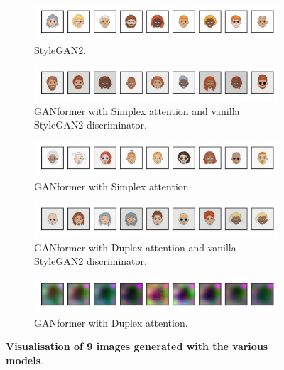 \documentclass{article}
\begin{document}
	
	\begin{figure}[htpb]
		\centering
		\begin{subfigure}{\linewidth}
			\includegraphics[width=\linewidth]{random_Stylegan2_300kimg.png}
			\vspace{-7mm}
			\caption{StyleGAN2.} 
		\end{subfigure}
		\begin{subfigure}{\linewidth}
			\includegraphics[width=\linewidth]{random_GANFormer_Simplex_D_Stylegan2_300kimg.png}
			\vspace{-7mm}
			\caption{GANformer with Simplex attention and vanilla StyleGAN2 discriminator.}
		\end{subfigure}
		\begin{subfigure}{\linewidth}
			\includegraphics[width=\linewidth]{random_GANFormer_Simplex_D_Att_300kimg.png}
			\vspace{-7mm}
			\caption{GANformer with Simplex attention.}
		\end{subfigure}
		\begin{subfigure}{\linewidth}
			\includegraphics[width=\linewidth]{random_GANFormer_Duplex_D_Stylegan2_300kimg.png}
			\vspace{-7mm}
			\caption{GANformer with Duplex attention and vanilla StyleGAN2 discriminator.}
		\end{subfigure}
		\begin{subfigure}{\linewidth}
			\includegraphics[width=\linewidth]{random_GANFormer_Duplex_D_Att_300kimg.png}
			\vspace{-7mm}
			\caption{GANformer with Duplex attention.}
		\end{subfigure}
		\vspace{3mm}
		\caption{\textbf{Visualisation of 9 images generated with the various models}.}\label{fig:random}
	\end{figure}
	
\end{document}
